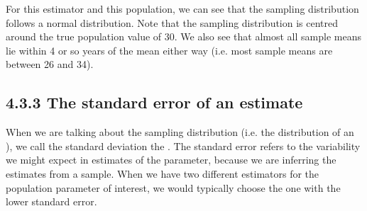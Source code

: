 \documentclass[letterpaper,10pt,english]{jupyterBook}
\begin{document}
\sphinxAtStartPar
For this estimator and this population, we can see that the sampling distribution follows a normal distribution. Note that the sampling distribution is centred around the true population value of 30. We also see that almost all sample means lie within 4 or so years of the mean either way (i.e. most sample means are between 26 and 34).

\begin{sphinxVerbatim}[commandchars=\\\{\}]
 
     

\PYG{p}{[}\PYG{p}{]} 
                 
         
\end{sphinxVerbatim}

\noindent{}


\subsection{4.3.3 The standard error of an estimate}
\label{\detokenize{04.d. Population.and.samples:the-standard-error-of-an-estimate}}
\sphinxAtStartPar
When we are talking about the sampling distribution (i.e. the distribution of an ), we call the standard deviation the . The standard error refers to the variability we might expect in estimates of the parameter, because we are inferring the estimates from a sample. When we have two different estimators for the population parameter of interest, we would typically choose the one with the lower standard error.
\end{document}
